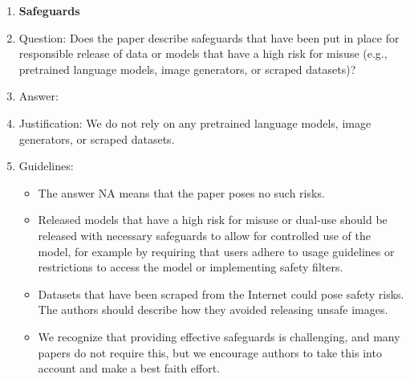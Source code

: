 \documentclass{article} %
\newcounter{ct}
\theoremstyle{definition}
\theoremstyle{remark}
\begin{document}
\begin{enumerate}
\item {\bf Safeguards}
    \item[] Question: Does the paper describe safeguards that have been put in place for responsible release of data or models that have a high risk for misuse (e.g., pretrained language models, image generators, or scraped datasets)?
    \item[] Answer: \answerNA{} %
    \item[] Justification: We do not rely on any pretrained language models, image generators, or scraped datasets.
    \item[] Guidelines:
    \begin{itemize}
        \item The answer NA means that the paper poses no such risks.
        \item Released models that have a high risk for misuse or dual-use should be released with necessary safeguards to allow for controlled use of the model, for example by requiring that users adhere to usage guidelines or restrictions to access the model or implementing safety filters.
        \item Datasets that have been scraped from the Internet could pose safety risks. The authors should describe how they avoided releasing unsafe images.
        \item We recognize that providing effective safeguards is challenging, and many papers do not require this, but we encourage authors to take this into account and make a best faith effort.
    \end{itemize}


\end{enumerate}
\end{document}
